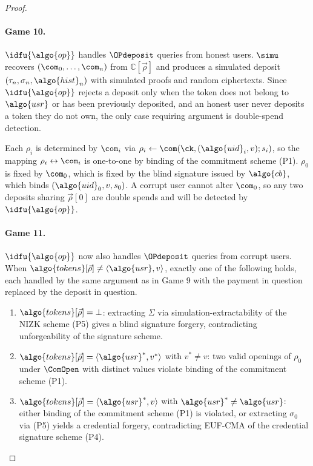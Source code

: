 \begin{proof}
\paragraph{Game 10.} $\idfu{\algo{op}}$ handles $\OPdeposit$ queries from honest
users.  $\simu$ recovers $(\com_0, \ldots, \com_n)$ from
$\mathbb{C}[\vec{\rho}]$ and produces a simulated deposit $(\tau_n, \sigma_n,
\algo{hist}_n)$ with simulated proofs and random ciphertexts. Since $\idfu{\algo{op}}$
rejects a deposit only when the token does not belong to $\algo{usr}$ or has
been previously deposited, and an honest user never deposits a token they do
not own, the only case requiring argument is double-spend detection.

Each $\rho_i$ is determined by $\com_i$ via $\rho_i \leftarrow \com(\ck,
(\algo{uid}_i, v); s_i)$, so the mapping $\rho_i \leftrightarrow \com_i$ is
one-to-one by binding of the commitment scheme (P1). $\rho_0$ is fixed by
$\com_0$, which is fixed by the blind signature issued by $\algo{cb}$, which
binds $(\algo{uid}_0, v, s_0)$. A corrupt user cannot alter $\com_0$, so any
two deposits sharing $\vec{\rho}[0]$ are double spends and will be detected by
$\idfu{\algo{op}}$.

\paragraph{Game 11.} $\idfu{\algo{op}}$ now also handles $\OPdeposit$ queries from
corrupt users. When $\algo{tokens}[\vec{\rho}] \neq \langle \algo{usr}, v
\rangle$, exactly one of the following holds, each handled by the same argument
as in Game 9 with the payment in question replaced by the deposit in question.

\begin{enumerate}[label=\alph*)]

  \item $\algo{tokens}[\vec{\rho}] = \bot$: extracting $\Sigma$ via
    simulation-extractability of the NIZK scheme (P5) gives a blind signature
    forgery, contradicting unforgeability of the signature scheme.

  \item $\algo{tokens}[\vec{\rho}] = \langle \algo{usr}^*, v^* \rangle$ with
    $v^* \neq v$: two valid openings of $\rho_0$ under $\ComOpen$ with distinct
    values violate binding of the commitment scheme (P1).

  \item $\algo{tokens}[\vec{\rho}] = \langle \algo{usr}^*, v \rangle$ with
    $\algo{usr}^* \neq \algo{usr}$: either binding of the commitment scheme
    (P1) is violated, or extracting $\sigma_0$ via (P5) yields a credential
    forgery, contradicting EUF-CMA of the credential signature scheme (P4).


\end{enumerate}
\end{proof}
